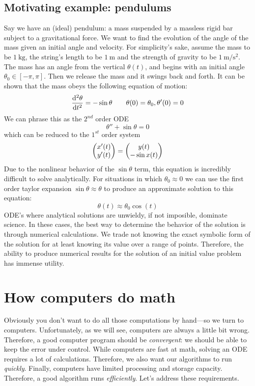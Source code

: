 \documentclass{article}
\newcommand{\y}{\vb{y}}
\newcommand{\0}{\vb{0}}
\begin{document}
\subsection{Motivating example: pendulums}

Say we have an (ideal) pendulum: a mass suspended by a massless rigid bar subject to a gravitational force. We want to find the evolution of the angle of the mass given an initial angle and velocity. For simplicity's sake, assume the mass to be $\SI{1}{\kilo\gram}$, the string's length to be $\SI{1}{\meter}$ and the strength of gravity to be $\SI{1}{\meter\per\second^2}$. The mass has an angle from the vertical $\theta(t)$, and begins with an initial angle $\theta_0 \in [-\pi, \pi]$. Then we release the mass and it swings back and forth. It can be shown that the mass obeys the following equation of motion:
\[\dv[2]{\theta}{t} = -\sin\theta \qquad \theta(0) = \theta_0, \theta'(0) = 0\]
We can phrase this as the $2^{nd}$ order ODE
\[\theta'' + \sin\theta = 0\]
which can be reduced to the $1^{st}$ order system
\[\mqty(x'(t)\\y'(t)) = \mqty(y(t)\\-\sin x(t))\]
Due to the nonlinear behavior of the $\sin\theta$ term, this equation is incredibly difficult to solve analytically. For situations in which $\theta_0 \approx 0$ we can use the first order taylor expansion $\sin\theta \approx \theta$ to produce an approximate solution to this equation:
\[\theta(t) \approx \theta_0\cos(t)\]
ODE's where analytical solutions are unwieldy, if not imposible, dominate science. In these cases, the best way to determine the behavior of the solution is through numerical calculations. We trade not knowing the exact symbolic form of the solution for at least knowing its value over a range of points. Therefore, the ability to produce numerical results for the solution of an initial value problem has immense utility.

\section{How computers do math}

Obviously you don't want to do all those computations by hand---so we turn to computers. Unfortunately, as we will see, computers are always a little bit wrong. Therefore, a good computer program should be \emph{convergent}: we should be able to keep the error under control. While computers are fast at math, solving an ODE requires a lot of calculations. Therefore, we also want our algorithms to run \emph{quickly}. Finally, computers have limited processing and storage capacity. Therefore, a good algorithm runs \emph{efficiently}. Let's address these requirements.
\end{document}
